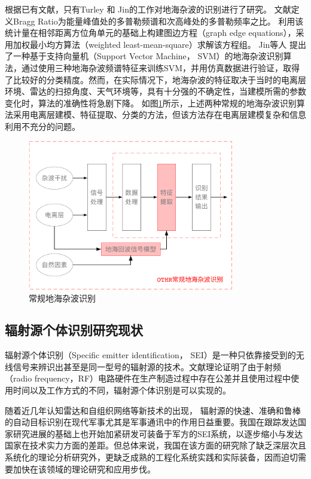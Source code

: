 根据已有文献，只有Turley 和 Jin的工作对地海杂波的识别进行了研究。
文献\cite{turley2013high}定义Bragg Ratio为能量峰值处的多普勒频谱和次高峰处的多普勒频率之比。
利用该统计量在相邻距离方位角单元的基础上构建图边方程（graph edge equations），采用加权最小均方算法（weighted least-mean-square）求解该方程组。
Jin等人 提出了一种基于支持向量机（Support Vector Machine， SVM）的地海杂波识别算法，通过使用三种地海杂波频谱特征来训练SVM，并用仿真数据进行验证，取得了比较好的分类精度。然而，在实际情况下，地海杂波的特征取决于当时的电离层环境、雷达的扫掠角度、天气环境等，具有十分强的不确定性，当建模所需的参数变化时，算法的准确性将急剧下降。
如图\ref{fig:othr_tradition}所示，上述两种常规的地海杂波识别算法采用电离层建模、特征提取、分类的方法，但该方法存在电离层建模复杂和信息利用不充分的问题。
\begin{figure}[hbt]
	\centering
	\includegraphics[width=9cm]{figures/introduction/othr_tradition}
	\caption{常规地海杂波识别}
	\label{fig:othr_tradition}
\end{figure}

\subsection{辐射源个体识别研究现状}
辐射源个体识别（Specific emitter identification， SEI）是一种只依靠接受到的无线信号来辨识出甚至是同一型号的辐射源的技术。文献\cite{danev2012physical}理论证明了由于射频（radio frequency，RF）电路硬件在生产制造过程中存在公差并且使用过程中使用时间以及工作方式的不同，辐射源个体识别是可以实现的。

随着近几年认知雷达和自组织网络等新技术的出现，
辐射源的快速、准确和鲁棒的自动目标识别在现代军事尤其是军事通讯中的作用日益重要。我国在跟踪发达国家研究进展的基础上也开始加紧研发可装备于军方的SEI系统，以逐步缩小与发达国家在技术实力方面的差距。但总体来说，我国在该方面的研究除了缺乏深层次且系统化的理论分析研究外，更缺乏成熟的工程化系统实践和实际装备，因而迫切需要加快在该领域的理论研究和应用步伐。

